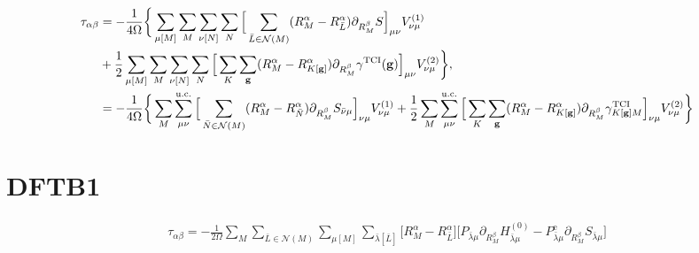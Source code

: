 \documentclass[11pt,a4paper]{article}
\begin{document}
\begin{align}
\tau_{\alpha\beta} &= -\frac{1}{4\Omega} \bigg\{ \sum_{\mu[M]} \sum_M \sum_{\nu[N]} \sum_{N} \Big[ \sum_{\bar{L}\in\mathcal{N}(M)} (R_M^\alpha - R_{\bar{L}}^\alpha) \partial_{R^\beta_M} S \Big]_{\mu\nu} V^{(1)}_{\nu\mu} \notag
\\
&+ \frac{1}{2} \sum_{\mu[M]} \sum_M \sum_{\nu[N]} \sum_{N} \Big[ \sum_K \sum_{\mathbf{g}} (R_M^\alpha - R_{K[\mathbf{g}]}^\alpha) \partial_{R^\beta_M} \gamma^\mathrm{TCI}(\mathbf{g}) \Big]_{\mu\nu} V^{(2)}_{\nu\mu} \bigg\},
\\
&= -\frac{1}{4\Omega} \bigg\{ \sum_M \sum_{\mu\nu}^\mathrm{u.c.} \Big[ \sum_{\bar{N}\in\mathcal{N}(M)} (R_M^\alpha - R_{\bar{N}}^\alpha) \partial_{R^\beta_M} S_{\bar{\nu}\mu} \Big]_{\nu\mu} V^{(1)}_{\nu\mu} + \frac{1}{2} \sum_M \sum_{\mu\nu}^\mathrm{u.c.} \Big[ \sum_K \sum_{\mathbf{g}} (R_M^\alpha - R_{K[\mathbf{g}]}^\alpha) \partial_{R^\beta_M} \gamma^\mathrm{TCI}_{K[\mathbf{g}]M} \Big]_{\nu\mu} V^{(2)}_{\nu\mu} \bigg\}
\end{align}

\section*{DFTB1}
\begin{align}
\tau_{\alpha\beta} = -\frac{1}{2\Omega} \sum_{M} \sum_{\bar{L}\in\mathcal{N}(M)} \sum_{\mu[M]} \sum_{\bar{\lambda}[\bar{L}]} \big[ R_M^\alpha - R_{\bar{L}}^\alpha \big] \Big[ P_{\bar{\lambda}\mu} \partial_{R^\beta_M} H^{(0)}_{\bar{\lambda}\mu} - P^\mathrm{e}_{\bar{\lambda}\mu} \partial_{R^\beta_M} S_{\bar{\lambda}\mu} \Big]
\end{align}
\end{document}
